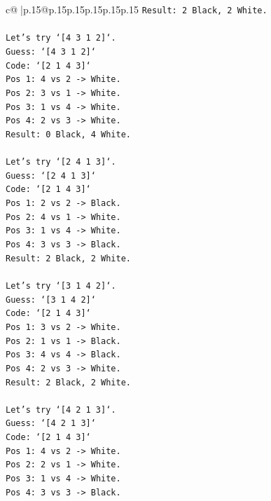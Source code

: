 \documentclass{article}
\begin{document}
{\begin{supertabular}{c@{$\;$}|p{.15\linewidth}@{}p{.15\linewidth}p{.15\linewidth}p{.15\linewidth}p{.15\linewidth}p{.15\linewidth}}
{{{\texttt{Result: 2 Black, 2 White.} \\
\\ 
\texttt{Let's try `{[}4 3 1 2{]}`.} \\
\texttt{Guess: `{[}4 3 1 2{]}`} \\
\texttt{Code: `{[}2 1 4 3{]}`} \\
\texttt{Pos 1: 4 vs 2 {-}> White.} \\
\texttt{Pos 2: 3 vs 1 {-}> White.} \\
\texttt{Pos 3: 1 vs 4 {-}> White.} \\
\texttt{Pos 4: 2 vs 3 {-}> White.} \\
\texttt{Result: 0 Black, 4 White.} \\
\\ 
\texttt{Let's try `{[}2 4 1 3{]}`.} \\
\texttt{Guess: `{[}2 4 1 3{]}`} \\
\texttt{Code: `{[}2 1 4 3{]}`} \\
\texttt{Pos 1: 2 vs 2 {-}> Black.} \\
\texttt{Pos 2: 4 vs 1 {-}> White.} \\
\texttt{Pos 3: 1 vs 4 {-}> White.} \\
\texttt{Pos 4: 3 vs 3 {-}> Black.} \\
\texttt{Result: 2 Black, 2 White.} \\
\\ 
\texttt{Let's try `{[}3 1 4 2{]}`.} \\
\texttt{Guess: `{[}3 1 4 2{]}`} \\
\texttt{Code: `{[}2 1 4 3{]}`} \\
\texttt{Pos 1: 3 vs 2 {-}> White.} \\
\texttt{Pos 2: 1 vs 1 {-}> Black.} \\
\texttt{Pos 3: 4 vs 4 {-}> Black.} \\
\texttt{Pos 4: 2 vs 3 {-}> White.} \\
\texttt{Result: 2 Black, 2 White.} \\
\\ 
\texttt{Let's try `{[}4 2 1 3{]}`.} \\
\texttt{Guess: `{[}4 2 1 3{]}`} \\
\texttt{Code: `{[}2 1 4 3{]}`} \\
\texttt{Pos 1: 4 vs 2 {-}> White.} \\
\texttt{Pos 2: 2 vs 1 {-}> White.} \\
\texttt{Pos 3: 1 vs 4 {-}> White.} \\
\texttt{Pos 4: 3 vs 3 {-}> Black.} \\
}}}
\end{supertabular}}
\end{document}
